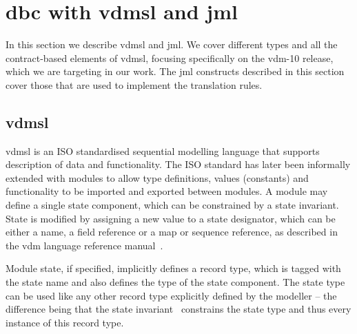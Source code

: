 \section{\ac{dbc} with \ac{vdmsl} and \ac{jml}}
\label{sec:vdmjml}

In this section we describe \ac{vdmsl} and \ac{jml}. We cover
different types and all the contract-based elements of \ac{vdmsl},
focusing specifically on the \ac{vdm}-10 release, which we are
targeting in our work. The \ac{jml} constructs described in this
section cover those that are used to implement the translation rules.

\subsection{\ac{vdmsl}}
\label{sub:vdmsl}

\ac{vdmsl} is an ISO standardised sequential modelling language that
supports description of data and functionality. The ISO standard has
later been informally extended with modules to allow type definitions,
values (constants) and functionality to be imported and exported
between modules. A module may define a single state component, which
can be constrained by a state invariant. State is modified by
assigning a new value to a state designator, which can be either a
name, a field reference or a map or sequence reference, as described
in the \ac{vdm} language reference manual~\cite{Larsen&10b}.

Module state, if specified, implicitly defines a record type, which is
tagged with the state name and also defines the type of the state
component. The state type can be used like any other record type
explicitly defined by the modeller -- the difference being that the
state invariant~\cite{Andrews&98} constrains the state type and thus
every instance of this record type.

